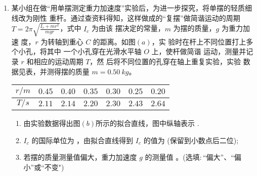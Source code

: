 \begin{enumerate}
\begin{enumerate}
\end{enumerate}




\newpage
\item 
{}
某小组在做“用单摆测定重力加速度”实验后，为进一步探究，将单摆的轻质细线改为刚性
重杆。通过查资料得知，这样做成的“复摆”做简谐运动的周期 $T=2 \pi \sqrt{\frac{I _c+m r^{2}}{m g r}}$，式中 $ I_{c} $ 为由该
摆决定的常量，$ m $ 为摆的质量，$ g $ 为重力加速
度，$ r $ 为转轴到重心 $ C $ 的距离。如图$ (a) $，实
验时在杆上不同位置打上多个小孔，将其中
一个小孔穿在光滑水平轴 $ O $ 上，使杆做简谐
运动，测量并记录 $ r $ 和相应的运动周期 $ T $，然
后将不同位置的孔穿在轴上重复实验，实验
数据见表，并测得摆的质量 $ m=0.50 \ kg $。
\begin{figure}[h!]
\centering

\end{figure}



\begin{table}[h!]
\centering 
\begin{tabular}{|c|c|c|c|c|c|c|}
\hline 
$ r/m $ & $ 0.45 $ & $ 0.40 $ & $ 0.35 $ & $ 0.30 $ & $ 0.25 $ & $ 0.20 $
 \\
\hline
$ T/s $ & $ 2.11 $ & $ 2.14 $ & $ 2.20 $ & $ 2.30 $ & $ 2.43 $ & $ 2.64 $\\ 
\hline 
\end{tabular}
\end{table} 


\begin{enumerate}
\renewcommand{\labelenumi}{\arabic{enumi}.}
\item
由实验数据得出图$ (b) $所示的拟合直线，图中纵轴表示
.




\item 
$ I_{c} $ 的国际单位为  
，由拟合直线得到 $ I_{c} $ 的值为
(保留到小数点后二位);




\item 
若摆的质量测量值偏大，重力加速度 $ g $ 的测量值
。(选填$ : $“偏大”、“偏小”或“不变")

\end{enumerate}





\end{enumerate}
